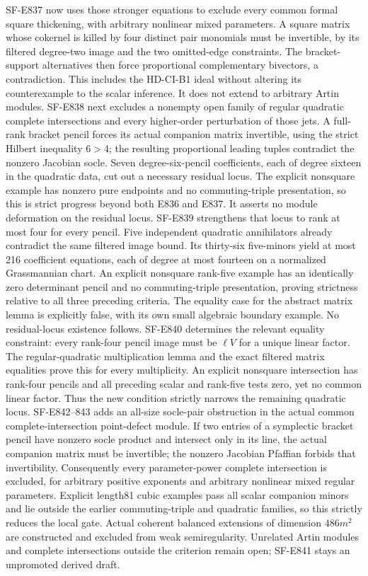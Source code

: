 \documentclass[11pt]{article}
\theoremstyle{remark}\newtheorem{remark}[theorem]{Remark}
\begin{document}
SF-E837 now uses those stronger equations to exclude every common
formal square thickening, with arbitrary nonlinear mixed parameters.
A square matrix whose cokernel is killed by four distinct pair
monomials must be invertible, by its filtered degree-two image and
the two omitted-edge constraints. The bracket-support alternatives
then force proportional complementary bivectors, a contradiction.
This includes the HD-CI-B1 ideal without altering its counterexample
to the scalar inference. It does not extend to arbitrary Artin modules.
SF-E838 next excludes a nonempty open family of regular quadratic
complete intersections and every higher-order perturbation of those
jets. A full-rank bracket pencil forces its actual companion matrix
invertible, using the strict Hilbert inequality $6>4$; the resulting
proportional leading tuples contradict the nonzero Jacobian socle.
Seven degree-six-pencil coefficients, each of degree sixteen in the
quadratic data, cut out a necessary residual locus. The explicit
nonsquare example has nonzero pure endpoints and no commuting-triple
presentation, so this is strict progress beyond both E836 and E837.
It asserts no module deformation on the residual locus.
SF-E839 strengthens that locus to rank at most four for every pencil.
Five independent quadratic annihilators already contradict the same
filtered image bound. Its thirty-six five-minors yield at most 216
coefficient equations, each of degree at most fourteen on a normalized
Grassmannian chart. An explicit nonsquare rank-five example has an
identically zero determinant pencil and no commuting-triple presentation,
proving strictness relative to all three preceding criteria. The equality
case for the abstract matrix lemma is explicitly false, with its own
small algebraic boundary example. No residual-locus existence follows.
SF-E840 determines the relevant equality constraint: every rank-four
pencil image must be $\ell V$ for a unique linear factor. The
regular-quadratic multiplication lemma and the exact filtered matrix
equalities prove this for every multiplicity. An explicit nonsquare
intersection has rank-four pencils and all preceding scalar and
rank-five tests zero, yet no common linear factor. Thus the new
condition strictly narrows the remaining quadratic locus.
SF-E842--843 adds an all-size socle-pair obstruction in the actual
common complete-intersection point-defect module. If two entries of
a symplectic bracket pencil have nonzero socle product and intersect
only in its line, the actual companion matrix must be invertible;
the nonzero Jacobian Pfaffian forbids that invertibility.
Consequently every parameter-power complete intersection is excluded,
for arbitrary positive exponents and arbitrary nonlinear mixed regular
parameters. Explicit length81 cubic examples pass all scalar companion
minors and lie outside the earlier commuting-triple and quadratic
families, so this strictly reduces the local gate. Actual coherent
balanced extensions of dimension $486m^2$ are constructed and excluded
from weak semiregularity. Unrelated Artin modules and complete
intersections outside the criterion remain open; SF-E841 stays an
unpromoted derived draft.
\end{document}
